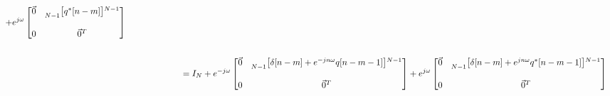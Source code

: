 \documentclass{article}
\begin{document}
\begin{align*}
                                                   + e^{j\omega}\begin{bmatrix}
                                                                    \vec{0} & \prescript{}{N - 1}{\begin{bmatrix} q^{*}[n - m] \end{bmatrix}}^{N - 1} \\ \\
                                                                         0  & \vec{0}^{T}
                                                                  \end{bmatrix} \\ \\
    &\quad \quad \quad \quad \quad \quad \ = I_{N} + e^{-j\omega}\begin{bmatrix}
                                                                    \vec{0} & \prescript{}{N - 1}{\begin{bmatrix} \delta[n - m] + e^{-jn\omega}q[n - m - 1] \end{bmatrix}}^{N - 1} \\ \\
                                                                         0  & \vec{0}^{T}
                                                                   \end{bmatrix}
                                                   + e^{j\omega}\begin{bmatrix}
                                                                    \vec{0} & \prescript{}{N - 1}{\begin{bmatrix} \delta[n - m] + e^{jn\omega}q^{*}[n - m - 1] \end{bmatrix}}^{N - 1} \\ \\
                                                                         0  & \vec{0}^{T}
                                                                  \end{bmatrix}
  \end{align*}
\end{document}
